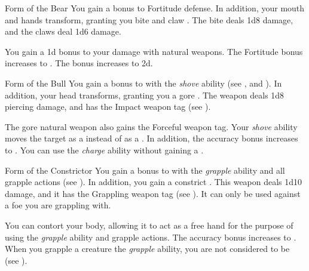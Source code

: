         {
            \begin{freeability}{Form of the Bear}
                You gain a  bonus to Fortitude defense.
                In addition, your mouth and hands transform, granting you bite and claw .
                The bite deals 1d8 damage, and the claws deal 1d6 damage.

                \rankline
                 You gain a \plus1d bonus to your damage with natural weapons.
                 The Fortitude bonus increases to .
                 The bonus increases to \plus2d.
            \end{freeability}

            \begin{freeability}{Form of the Bull}
                You gain a  bonus to  with the \textit{shove} ability (see , and ).
                In addition, your head transforms, granting you a gore .
                The weapon deals 1d8 piercing damage, and has the Impact weapon tag (see ).

                \rankline
                 The gore natural weapon also gains the Forceful weapon tag.
                 Your \textit{shove} ability moves the target as a  instead of as a .
                In addition, the accuracy bonus increases to .
                 You can use the \textit{charge} ability without gaining a .
            \end{freeability}

            \begin{freeability}{Form of the Constrictor}
                You gain a  bonus to  with the \textit{grapple} ability and all grapple actions (see ).
                In addition, you gain a constrict .
                This weapon deals 1d10 damage, and it has the Grappling weapon tag (see ).
                It can only be used against a foe you are grappling with.

                \rankline
                 You can contort your body, allowing it to act as a free hand for the purpose of using the \textit{grapple} ability and grapple actions.
                 The accuracy bonus increases to .
                 When you grapple a creature the \textit{grapple} ability, you are not considered to be  (see ).
            \end{freeability}

}
